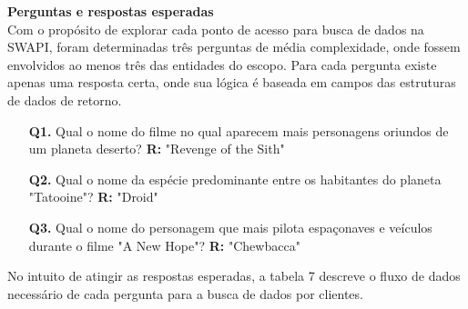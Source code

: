 \textbf{Perguntas e respostas esperadas} \\

Com o propósito de explorar cada ponto de acesso para busca de dados na SWAPI, foram determinadas três perguntas de média complexidade, onde fossem envolvidos ao menos três das entidades do escopo. Para cada pergunta existe apenas uma resposta certa, onde sua lógica é baseada em campos das estruturas de dados de retorno.

\begin{enumerate}
\item[\textbf{Q1.}] Qual o nome do filme no qual aparecem mais personagens oriundos de um planeta deserto? \textbf{R:} "Revenge of the Sith"
\item[\textbf{Q2.}] Qual o nome da espécie predominante entre os habitantes do planeta "Tatooine"? \textbf{R:} "Droid"
\item[\textbf{Q3.}] Qual o nome do personagem que mais pilota espaçonaves e veículos durante o filme "A New Hope"? \textbf{R:} "Chewbacca"
\end{enumerate}

No intuito de atingir as respostas esperadas, a tabela 7 descreve o fluxo de dados necessário de cada pergunta para a busca de dados por clientes.

